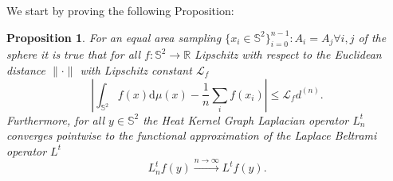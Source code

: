 \documentclass{article} %
\newtheorem{definition}{Definition}[section]
\newtheorem{prop}{Proposition}
\begin{document}


We start by proving the following Proposition:
\vspace{0.5cm}
\begin{prop}\label{prop:1}
	For an equal area sampling $\{x_i\in\mathbb S^2\}_{i=0}^{n-1}: A_i=A_j \forall i,j$ of the sphere it is true that for all $f: \mathbb S^2 \rightarrow \mathbb R$ Lipschitz with respect to the Euclidean distance $\|\cdot\|$ with Lipschitz constant $\mathcal L_f$
	$$
	\left| \int_{\mathbb S^2}f({ x})\text{d}{\mu(x)} - \frac{1}{n}\sum_i f( x_i)\right|\leq \mathcal L_fd^{(n)}.
	$$
	Furthermore, for all $y\in\mathbb S^2$ the Heat Kernel Graph Laplacian operator $L^t_n$ converges pointwise to the functional approximation of the Laplace Beltrami operator $L^t$
	$$ L_n^tf(y)\xrightarrow{n\to\infty} L^tf(y).$$
\end{prop}
\vspace{0.5cm}
\end{document}

